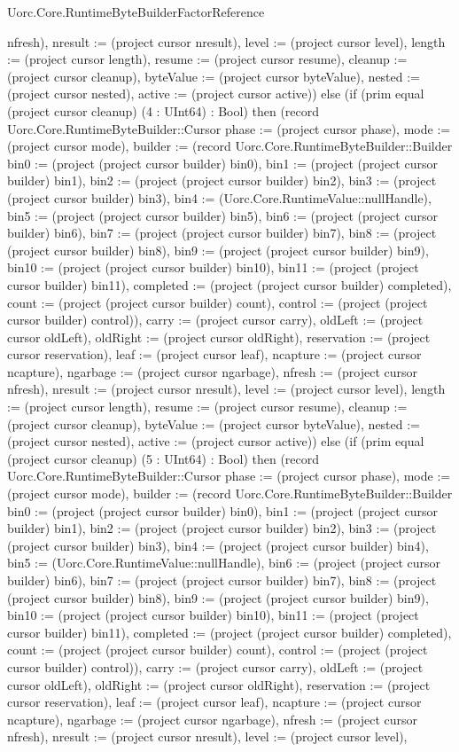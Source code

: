\begin{lexlean}{Uorc.Core.RuntimeByteBuilderFactorReference}
\begin{semanticmodule}
{nfresh), nresult := (project cursor nresult), level := (project cursor level), length := (project cursor length), resume := (project cursor resume), cleanup := (project cursor cleanup), byteValue := (project cursor byteValue), nested := (project cursor nested), active := (project cursor active)}) else (if (prim equal (project cursor cleanup) (4 : UInt64) : Bool) then (record Uorc.Core.RuntimeByteBuilder::Cursor {phase := (project cursor phase), mode := (project cursor mode), builder := (record Uorc.Core.RuntimeByteBuilder::Builder {bin0 := (project (project cursor builder) bin0), bin1 := (project (project cursor builder) bin1), bin2 := (project (project cursor builder) bin2), bin3 := (project (project cursor builder) bin3), bin4 := (Uorc.Core.RuntimeValue::nullHandle), bin5 := (project (project cursor builder) bin5), bin6 := (project (project cursor builder) bin6), bin7 := (project (project cursor builder) bin7), bin8 := (project (project cursor builder) bin8), bin9 := (project (project cursor builder) bin9), bin10 := (project (project cursor builder) bin10), bin11 := (project (project cursor builder) bin11), completed := (project (project cursor builder) completed), count := (project (project cursor builder) count), control := (project (project cursor builder) control)}), carry := (project cursor carry), oldLeft := (project cursor oldLeft), oldRight := (project cursor oldRight), reservation := (project cursor reservation), leaf := (project cursor leaf), ncapture := (project cursor ncapture), ngarbage := (project cursor ngarbage), nfresh := (project cursor nfresh), nresult := (project cursor nresult), level := (project cursor level), length := (project cursor length), resume := (project cursor resume), cleanup := (project cursor cleanup), byteValue := (project cursor byteValue), nested := (project cursor nested), active := (project cursor active)}) else (if (prim equal (project cursor cleanup) (5 : UInt64) : Bool) then (record Uorc.Core.RuntimeByteBuilder::Cursor {phase := (project cursor phase), mode := (project cursor mode), builder := (record Uorc.Core.RuntimeByteBuilder::Builder {bin0 := (project (project cursor builder) bin0), bin1 := (project (project cursor builder) bin1), bin2 := (project (project cursor builder) bin2), bin3 := (project (project cursor builder) bin3), bin4 := (project (project cursor builder) bin4), bin5 := (Uorc.Core.RuntimeValue::nullHandle), bin6 := (project (project cursor builder) bin6), bin7 := (project (project cursor builder) bin7), bin8 := (project (project cursor builder) bin8), bin9 := (project (project cursor builder) bin9), bin10 := (project (project cursor builder) bin10), bin11 := (project (project cursor builder) bin11), completed := (project (project cursor builder) completed), count := (project (project cursor builder) count), control := (project (project cursor builder) control)}), carry := (project cursor carry), oldLeft := (project cursor oldLeft), oldRight := (project cursor oldRight), reservation := (project cursor reservation), leaf := (project cursor leaf), ncapture := (project cursor ncapture), ngarbage := (project cursor ngarbage), nfresh := (project cursor nfresh), nresult := (project cursor nresult), level := (project cursor level), }
\end{semanticmodule}
\end{lexlean}
